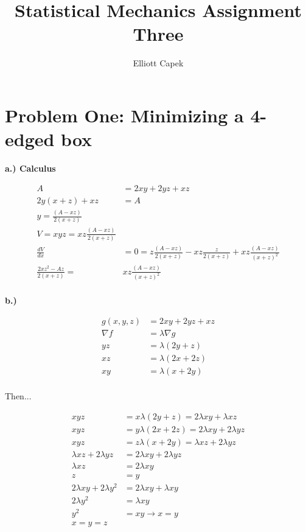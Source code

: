 \documentclass[10pt]{article} %
\title{Statistical Mechanics Assignment Three}
\author{Elliott Capek}
\begin{document}
\maketitle{}

\section{Problem One: Minimizing a 4-edged box}
\textbf{a.) Calculus}

\begin{align*}
  A &= 2xy + 2yz + xz\\
  2y(x+z) + xz &= A\\
  y = \frac{\left(A - xz\right)}{2\left(x+z\right)}\\
  V = xyz = xz\frac{\left(A - xz\right)}{2\left(x+z\right)}\\
  \frac{dV}{dx} &= 0 = z\frac{\left(A - xz\right)}{2\left(x+z\right)}
  - xz\frac{z}{2\left(x+z\right)} + xz\frac{\left(A - xz\right)}{\left(x+z\right)^2}\\
  \frac{2xz^2 - Az}{2\left(x+z\right)} =& xz\frac{\left(A - xz\right)}{\left(x+z\right)^2}\\
\end{align*}

\textbf{b.)}

\begin{align*}
  g(x,y,z) &= 2xy + 2yz + xz\\
  \nabla f &= \lambda \nabla g\\
  yz &= \lambda(2y+z)\\
  xz &= \lambda(2x+2z)\\
  xy &= \lambda(x+2y)\\
\end{align*}

Then...

\begin{align*}
  xyz &= x\lambda(2y+z) = 2\lambda xy + \lambda xz\\
  xyz &= y\lambda(2x+2z)= 2\lambda xy + 2\lambda yz\\
  xyz &= z\lambda(x+2y) = \lambda xz + 2\lambda yz\\
  \lambda xz + 2\lambda yz &= 2\lambda xy + 2\lambda yz\\
  \lambda xz &= 2\lambda xy\\
  z &= y\\
  2\lambda xy + 2\lambda y^2 &= 2\lambda xy + \lambda xy\\
  2\lambda y^2 &= \lambda xy\\
  y^2 &= xy \rightarrow x = y\\
  x = y = z\\
\end{align*}
\end{document}
